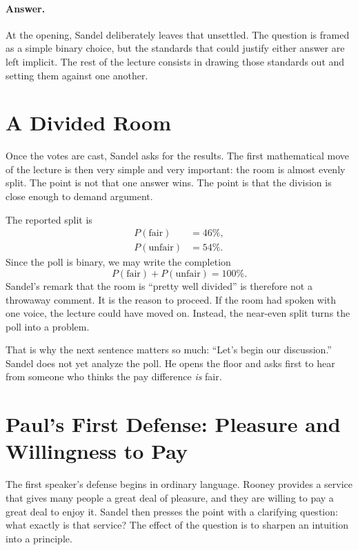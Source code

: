 \paragraph{Answer.} At the opening, Sandel deliberately leaves that unsettled. The question is framed as a simple binary choice, but the standards that could justify either answer are left implicit. The rest of the lecture consists in drawing those standards out and setting them against one another.

\section{A Divided Room}

Once the votes are cast, Sandel asks for the results. The first mathematical move of the lecture is then very simple and very important: the room is almost evenly split. The point is not that one answer wins. The point is that the division is close enough to demand argument.

The reported split is
\begin{align}
P(\text{fair}) &= 46\%,\\
P(\text{unfair}) &= 54\%.
\end{align}
Since the poll is binary, we may write the completion
\begin{equation}
P(\text{fair}) + P(\text{unfair}) = 100\%.
\end{equation}
Sandel's remark that the room is ``pretty well divided'' is therefore not a throwaway comment. It is the reason to proceed. If the room had spoken with one voice, the lecture could have moved on. Instead, the near-even split turns the poll into a problem.

That is why the next sentence matters so much: ``Let's begin our discussion.'' Sandel does not yet analyze the poll. He opens the floor and asks first to hear from someone who thinks the pay difference \emph{is} fair.

\section{Paul's First Defense: Pleasure and Willingness to Pay}

The first speaker's defense begins in ordinary language. Rooney provides a service that gives many people a great deal of pleasure, and they are willing to pay a great deal to enjoy it. Sandel then presses the point with a clarifying question: what exactly is that service? The effect of the question is to sharpen an intuition into a principle.

